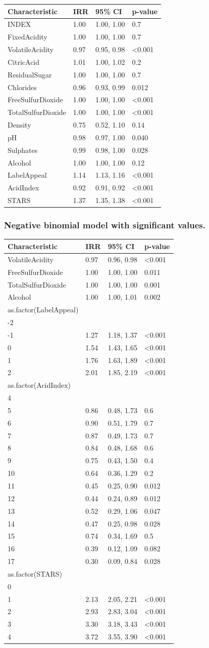 \documentclass[]{elsarticle} %
\begin{document}
\begin{longtable}[]{@{}llll@{}}
\toprule
\textbf{Characteristic} & \textbf{IRR} & \textbf{95\% CI} &
\textbf{p-value}\tabularnewline
\midrule
\endhead
INDEX & 1.00 & 1.00, 1.00 & 0.7\tabularnewline
FixedAcidity & 1.00 & 1.00, 1.00 & 0.7\tabularnewline
VolatileAcidity & 0.97 & 0.95, 0.98 & \textless0.001\tabularnewline
CitricAcid & 1.01 & 1.00, 1.02 & 0.2\tabularnewline
ResidualSugar & 1.00 & 1.00, 1.00 & 0.7\tabularnewline
Chlorides & 0.96 & 0.93, 0.99 & 0.012\tabularnewline
FreeSulfurDioxide & 1.00 & 1.00, 1.00 & \textless0.001\tabularnewline
TotalSulfurDioxide & 1.00 & 1.00, 1.00 & \textless0.001\tabularnewline
Density & 0.75 & 0.52, 1.10 & 0.14\tabularnewline
pH & 0.98 & 0.97, 1.00 & 0.040\tabularnewline
Sulphates & 0.99 & 0.98, 1.00 & 0.028\tabularnewline
Alcohol & 1.00 & 1.00, 1.00 & 0.12\tabularnewline
LabelAppeal & 1.14 & 1.13, 1.16 & \textless0.001\tabularnewline
AcidIndex & 0.92 & 0.91, 0.92 & \textless0.001\tabularnewline
STARS & 1.37 & 1.35, 1.38 & \textless0.001\tabularnewline
\bottomrule
\end{longtable}

\hypertarget{negative-binomial-model-with-significant-values.}{%
\subsubsection{Negative binomial model with significant
values.}\label{negative-binomial-model-with-significant-values.}}

\begin{longtable}[]{@{}llll@{}}
\toprule
\textbf{Characteristic} & \textbf{IRR} & \textbf{95\% CI} &
\textbf{p-value}\tabularnewline
\midrule
\endhead
VolatileAcidity & 0.97 & 0.96, 0.98 & \textless0.001\tabularnewline
FreeSulfurDioxide & 1.00 & 1.00, 1.00 & 0.011\tabularnewline
TotalSulfurDioxide & 1.00 & 1.00, 1.00 & 0.001\tabularnewline
Alcohol & 1.00 & 1.00, 1.01 & 0.002\tabularnewline
as.factor(LabelAppeal) & & &\tabularnewline
-2 & & &\tabularnewline
-1 & 1.27 & 1.18, 1.37 & \textless0.001\tabularnewline
0 & 1.54 & 1.43, 1.65 & \textless0.001\tabularnewline
1 & 1.76 & 1.63, 1.89 & \textless0.001\tabularnewline
2 & 2.01 & 1.85, 2.19 & \textless0.001\tabularnewline
as.factor(AcidIndex) & & &\tabularnewline
4 & & &\tabularnewline
5 & 0.86 & 0.48, 1.73 & 0.6\tabularnewline
6 & 0.90 & 0.51, 1.79 & 0.7\tabularnewline
7 & 0.87 & 0.49, 1.73 & 0.7\tabularnewline
8 & 0.84 & 0.48, 1.68 & 0.6\tabularnewline
9 & 0.75 & 0.43, 1.50 & 0.4\tabularnewline
10 & 0.64 & 0.36, 1.29 & 0.2\tabularnewline
11 & 0.45 & 0.25, 0.90 & 0.012\tabularnewline
12 & 0.44 & 0.24, 0.89 & 0.012\tabularnewline
13 & 0.52 & 0.29, 1.06 & 0.047\tabularnewline
14 & 0.47 & 0.25, 0.98 & 0.028\tabularnewline
15 & 0.74 & 0.34, 1.69 & 0.5\tabularnewline
16 & 0.39 & 0.12, 1.09 & 0.082\tabularnewline
17 & 0.30 & 0.09, 0.84 & 0.028\tabularnewline
as.factor(STARS) & & &\tabularnewline
0 & & &\tabularnewline
1 & 2.13 & 2.05, 2.21 & \textless0.001\tabularnewline
2 & 2.93 & 2.83, 3.04 & \textless0.001\tabularnewline
3 & 3.30 & 3.18, 3.43 & \textless0.001\tabularnewline
4 & 3.72 & 3.55, 3.90 & \textless0.001\tabularnewline
\bottomrule
\end{longtable}
\end{document}
